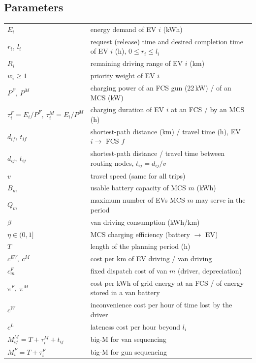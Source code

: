 \documentclass[11pt,a4paper]{article}
\begin{document}
\subsection*{Parameters}
\begin{tabularx}{\textwidth}{@{}lX@{}}
\toprule
$E_i$ & energy demand of EV $i$ (kWh) \\
$r_i,\ l_i$ & request (release) time and desired completion time of EV $i$ (h), $0\le r_i\le l_i$ \\
$R_i$ & remaining driving range of EV $i$ (km) \\
$w_i\ge1$ & priority weight of EV $i$ \\
$P^F,\ P^M$ & charging power of an FCS gun (22\,kW) / of an MCS (kW) \\
$\tau^F_i=E_i/P^F,\ \tau^M_i=E_i/P^M$ & charging duration of EV $i$ at an FCS / by an MCS (h) \\
$d_{if},\ t_{if}$ & shortest-path distance (km) / travel time (h), EV $i\to$ FCS $f$ \\
$d_{ij},\ t_{ij}$ & shortest-path distance / travel time between routing nodes, $t_{ij}=d_{ij}/v$ \\
$v$ & travel speed (same for all trips) \\
$B_m$ & usable battery capacity of MCS $m$ (kWh) \\
$Q_m$ & maximum number of EVs MCS $m$ may serve in the period \\
$\beta$ & van driving consumption (kWh/km) \\
$\eta\in(0,1]$ & MCS charging efficiency (battery $\to$ EV) \\
$T$ & length of the planning period (h) \\
$c^{EV},\ c^{M}$ & cost per km of EV driving / van driving \\
$c^{F}_m$ & fixed dispatch cost of van $m$ (driver, depreciation) \\
$\pi^F,\ \pi^M$ & cost per kWh of grid energy at an FCS / of energy stored in a van battery \\
$c^W$ & inconvenience cost per hour of time lost by the driver \\
$c^L$ & lateness cost per hour beyond $l_i$ \\
$M^M_{ij}=T+\tau^M_i+t_{ij}$ & big-M for van sequencing \\
$M^F_i=T+\tau^F_i$ & big-M for gun sequencing \\
\bottomrule
\end{tabularx}
\end{document}
